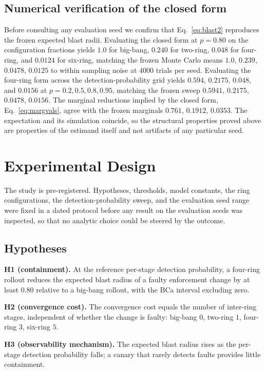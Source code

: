 \documentclass[journal]{IEEEtran}
\begin{document}
\subsection{Numerical verification of the closed form}
Before consulting any evaluation seed we confirm that Eq.~\eqref{eq:blast2} reproduces the frozen
expected blast radii. Evaluating the closed form at $p = 0.80$ on the configuration fractions yields
$1.0$ for big-bang, $0.240$ for two-ring, $0.048$ for four-ring, and $0.0124$ for six-ring, matching
the frozen Monte Carlo means $1.0$, $0.239$, $0.0478$, $0.0125$ to within sampling noise at $4000$
trials per seed. Evaluating the four-ring form across the detection-probability grid yields $0.594$,
$0.2175$, $0.048$, and $0.0156$ at $p = 0.2, 0.5, 0.8, 0.95$, matching the frozen sweep $0.5941$,
$0.2175$, $0.0478$, $0.0156$. The marginal reductions implied by the closed form, Eq.~\eqref{eq:margvals},
agree with the frozen marginals $0.761$, $0.1912$, $0.0353$. The expectation and its simulation
coincide, so the structural properties proved above are properties of the estimand itself and not
artifacts of any particular seed.

\section{Experimental Design}
The study is pre-registered. Hypotheses, thresholds, model constants, the ring configurations, the
detection-probability sweep, and the evaluation seed range were fixed in a dated protocol before any
result on the evaluation seeds was inspected, so that no analytic choice could be steered by the
outcome.

\subsection{Hypotheses}
\textbf{H1 (containment).} At the reference per-stage detection probability, a four-ring rollout
reduces the expected blast radius of a faulty enforcement change by at least 0.80 relative to a
big-bang rollout, with the BCa interval excluding zero.

\textbf{H2 (convergence cost).} The convergence cost equals the number of inter-ring stages,
independent of whether the change is faulty: big-bang $0$, two-ring $1$, four-ring $3$, six-ring $5$.

\textbf{H3 (observability mechanism).} The expected blast radius rises as the per-stage detection
probability falls; a canary that rarely detects faults provides little containment.
\end{document}
